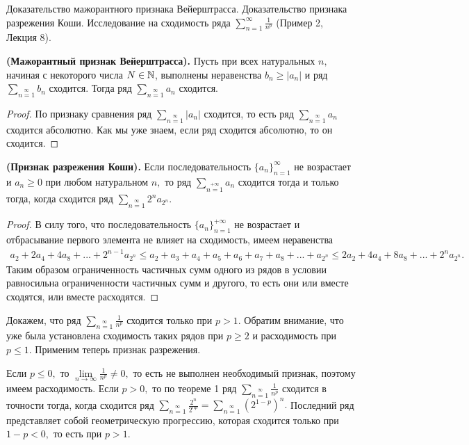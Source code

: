 \newpage
\begin{problem}
Доказательство мажорантного признака Вейерштрасса. Доказательство признака разрежения Коши. Исследование на сходимость ряда $\sum_{n=1}^{\infty} \frac{1}{n^p}$ (Пример 2, Лекция 8).
\end{problem}

\begin{proposition} \textbf{(Мажорантный признак Вейерштрасса).}
    Пусть при всех натуральных $n,$
    начиная с некоторого числа $N\in\mathbb{N}$,
    выполнены неравенства $b_n\geq|a_n|$
    и ряд $\sum\limits_{n=1}\limits^{\infty}b_n$
    сходится. Тогда ряд
    $\sum\limits_{n=1}\limits^{\infty}a_n$
    сходится.
\end{proposition}
\begin{proof}
    По признаку сравнения ряд
    $\sum\limits_{n=1}\limits^{\infty}|a_n|$
    сходится, то есть ряд
    $\sum\limits_{n=1}\limits^{\infty}a_n$ сходится
    абсолютно. Как мы уже знаем, если ряд сходится
    абсолютно, то он сходится.
\end{proof}

\begin{theorem}\textbf{(Признак разрежения Коши).}
    Если последовательность
    $\{a_n\}_{n=1}^{\infty}$ не возрастает
    и $a_n\geq0$ при любом натуральном
    $n,$ то ряд
    $\sum\limits_{n=1}\limits^{+\infty}a_n$
    сходится тогда и только тогда, когда
    сходится ряд
    $\sum\limits_{n=1}\limits^{\infty}2^na_{2^n}.$
\end{theorem}
\begin{proof}
    В силу того, что последовательность
    $\{a_n\}_{n=1}^{+\infty}$
    не возрастает и отбрасывание первого
    элемента не влияет на сходимость,
    имеем неравенства
    \begin{multline*}
        a_2+2a_4+4a_8+...+2^{n-1}a_{2^{n}}
        \leq a_2+a_3+a_4+a_5+a_6+a_7+a_8+...+a_{2^n}\leq
        2a_2+4a_4+8a_8+...+2^na_{2^n}.
    \end{multline*}
    Таким образом ограниченность частичных
    сумм одного из рядов в условии равносильна
    ограниченности частичных сумм и другого,
    то есть они или вместе сходятся, или
    вместе расходятся.
\end{proof}

\begin{example}
    Докажем, что ряд
    $\sum\limits_{n=1}\limits^{\infty}
        \frac{1}{n^p}$ сходится только при $p>1.$
    Обратим внимание, что уже была установлена
    сходимость таких рядов при $p\geq2$ и
    расходимость при $p\leq1.$ Применим
    теперь признак разрежения.

    Если $p\leq0,$ то
    $\lim\limits_{n\rightarrow\infty}
        \frac{1}{n^p}\neq0,$ то есть не выполнен
    необходимый признак, поэтому имеем
    расходимость. Если $p>0,$ то по теореме
    1 ряд $\sum\limits_{n=1}\limits^{\infty}
        \frac{1}{n^p}$ сходится в точности
    тогда, когда сходится ряд
    $\sum\limits_{n=1}\limits^{\infty}
        \frac{2^n}{2^{np}}=
        \sum\limits_{n=1}\limits^{\infty}
        (2^{1-p})^n.$ Последний ряд представляет
    собой геометрическую прогрессию, которая
    сходится только при $1-p<0,$
    то есть при $p>1.$
\end{example}

